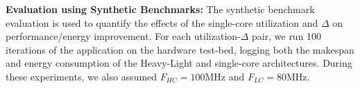 

\noindent\textbf{Evaluation using Synthetic Benchmarks: }
The synthetic benchmark evaluation is used to quantify the effects of the single-core utilization and $\Delta$ on performance/energy improvement. For each utilization-$\Delta$ pair, we run 100 iterations of the application on the hardware test-bed, logging both the makespan and energy consumption of the Heavy-Light and single-core architectures. During these experiments, we also assumed $F_{HC} = 100$MHz and $F_{LC} = 80$MHz.\par

